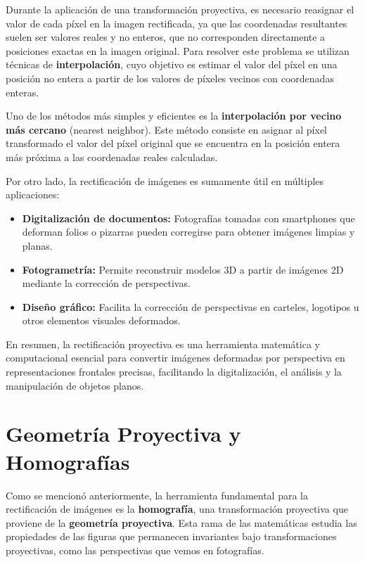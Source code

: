 Durante la aplicación de una transformación proyectiva, es necesario reasignar el valor de cada píxel en la imagen rectificada, ya que las coordenadas resultantes suelen ser valores reales y no enteros, que no corresponden directamente a posiciones exactas en la imagen original. Para resolver este problema se utilizan técnicas de \textbf{interpolación}, cuyo objetivo es estimar el valor del píxel en una posición no entera a partir de los valores de píxeles vecinos con coordenadas enteras.

Uno de los métodos más simples y eficientes es la \textbf{interpolación por vecino más cercano} (nearest neighbor). Este método consiste en asignar al píxel transformado el valor del píxel original que se encuentra en la posición entera más próxima a las coordenadas reales calculadas.

\label{sec:metodo_vecino}

\vspace{\baselineskip}

Por otro lado, la rectificación de imágenes es sumamente útil en múltiples aplicaciones:

\begin{itemize}
  \item \textbf{Digitalización de documentos:} Fotografías tomadas con smartphones que deforman folios o pizarras pueden corregirse para obtener imágenes limpias y planas.
  \item \textbf{Fotogrametría:} Permite reconstruir modelos 3D a partir de imágenes 2D mediante la corrección de perspectivas.
  \item \textbf{Diseño gráfico:} Facilita la corrección de perspectivas en carteles, logotipos u otros elementos visuales deformados.
\end{itemize}

En resumen, la rectificación proyectiva es una herramienta matemática y computacional esencial para convertir imágenes deformadas por perspectiva en representaciones frontales precisas, facilitando la digitalización, el análisis y la manipulación de objetos planos.


\section{Geometría Proyectiva y Homografías}

Como se mencionó anteriormente, la herramienta fundamental para la rectificación de imágenes es la \textbf{homografía}, una transformación proyectiva que proviene de la \textbf{geometría proyectiva}. Esta rama de las matemáticas estudia las propiedades de las figuras que permanecen invariantes bajo transformaciones proyectivas, como las perspectivas que vemos en fotografías.

